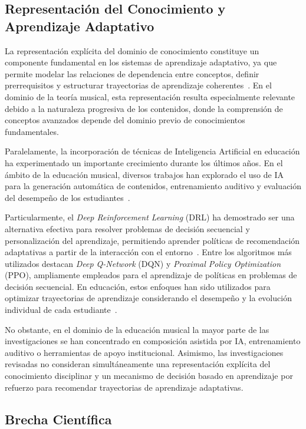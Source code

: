 \documentclass[conference]{IEEEtran}
\begin{document}
\subsection{Representación del Conocimiento y Aprendizaje Adaptativo}

La representación explícita del dominio de conocimiento constituye un componente fundamental en los sistemas de aprendizaje adaptativo, ya que permite modelar las relaciones de dependencia entre conceptos, definir prerrequisitos y estructurar trayectorias de aprendizaje coherentes~\cite{manrique2019kg}. En el dominio de la teoría musical, esta representación resulta especialmente relevante debido a la naturaleza progresiva de los contenidos, donde la comprensión de conceptos avanzados depende del dominio previo de conocimientos fundamentales.

Paralelamente, la incorporación de técnicas de Inteligencia Artificial en educación ha experimentado un importante crecimiento durante los últimos años. En el ámbito de la educación musical, diversos trabajos han explorado el uso de IA para la generación automática de contenidos, entrenamiento auditivo y evaluación del desempeño de los estudiantes~\cite{garcia2025}.

Particularmente, el \textit{Deep Reinforcement Learning} (DRL) ha demostrado ser una alternativa efectiva para resolver problemas de decisión secuencial y personalización del aprendizaje, permitiendo aprender políticas de recomendación adaptativas a partir de la interacción con el entorno~\cite{sutton2018reinforcement,mnih2015dqn}. Entre los algoritmos más utilizados destacan \textit{Deep Q-Network} (DQN) y \textit{Proximal Policy Optimization} (PPO), ampliamente empleados para el aprendizaje de políticas en problemas de decisión secuencial. En educación, estos enfoques han sido utilizados para optimizar trayectorias de aprendizaje considerando el desempeño y la evolución individual de cada estudiante~\cite{alrowais2025,li2025}.

No obstante, en el dominio de la educación musical la mayor parte de las investigaciones se han concentrado en composición asistida por IA, entrenamiento auditivo o herramientas de apoyo institucional. Asimismo, las investigaciones revisadas no consideran simultáneamente una representación explícita del conocimiento disciplinar y un mecanismo de decisión basado en aprendizaje por refuerzo para recomendar trayectorias de aprendizaje adaptativas.

\subsection{Brecha Científica}
\end{document}
